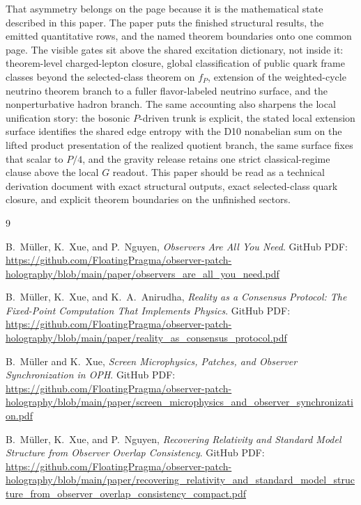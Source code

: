 \documentclass[11pt]{article}
\begin{document}
That asymmetry belongs on the page because it is the mathematical state described in
this paper. The paper puts the finished structural results, the emitted quantitative rows, and the
named theorem boundaries onto one common page. The visible gates sit above the shared
excitation dictionary, not inside it: theorem-level charged-lepton closure, global classification
of public quark frame classes beyond the selected-class theorem on \(f_P\), extension of the
weighted-cycle neutrino theorem branch to a fuller flavor-labeled neutrino surface, and the
nonperturbative hadron branch. The same accounting also sharpens the local unification story:
the bosonic \(P\)-driven trunk is explicit, the stated local extension surface identifies the shared
edge entropy with the D10 nonabelian sum on the lifted product presentation of the realized
quotient branch, the same surface fixes that scalar to \(P/4\), and the gravity release retains one
strict classical-regime clause above the local \(G\) readout. This paper should be read as a technical derivation document
with exact structural outputs, exact selected-class quark closure, and explicit theorem
boundaries on the unfinished sectors.

\appendix


\begin{thebibliography}{9}

B.\ M\"uller, K.\ Xue, and P.\ Nguyen,
\emph{Observers Are All You Need}.
GitHub PDF:
\url{https://github.com/FloatingPragma/observer-patch-holography/blob/main/paper/observers_are_all_you_need.pdf}

B.\ M\"uller, K.\ Xue, and K.\ A.\ Anirudha,
\emph{Reality as a Consensus Protocol: The Fixed-Point Computation That Implements Physics}.
GitHub PDF:
\url{https://github.com/FloatingPragma/observer-patch-holography/blob/main/paper/reality_as_consensus_protocol.pdf}

B.\ M\"uller and K.\ Xue,
\emph{Screen Microphysics, Patches, and Observer Synchronization in OPH}.
GitHub PDF:
\url{https://github.com/FloatingPragma/observer-patch-holography/blob/main/paper/screen_microphysics_and_observer_synchronization.pdf}

B.\ M\"uller, K.\ Xue, and P.\ Nguyen,
\emph{Recovering Relativity and Standard Model Structure from Observer Overlap Consistency}.
GitHub PDF:
\url{https://github.com/FloatingPragma/observer-patch-holography/blob/main/paper/recovering_relativity_and_standard_model_structure_from_observer_overlap_consistency_compact.pdf}

\end{thebibliography}
\end{document}

